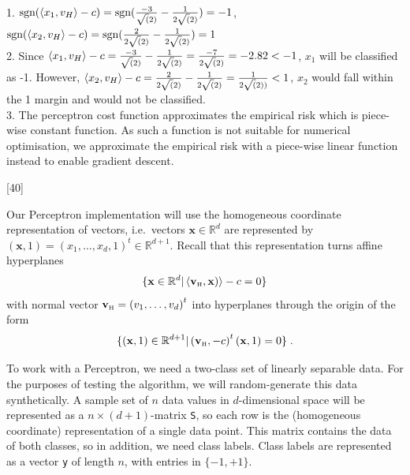 \documentclass[]{../util/ColumbiaAssm}
\begin{document}
\begin{questions}
\begin{solution}\\
1. $\textrm{sgn}(\sp{x_1, v_H} - c) = \textrm{sgn}(\frac{-3}{\sqrt(2)} - \frac{1}{2\sqrt(2)}) = -1$, $\textrm{sgn}(\sp{x_2, v_H} - c) = \textrm{sgn}(\frac{2}{2\sqrt(2)} - \frac{1}{2\sqrt(2)}) = 1$\\
2. Since $\sp{x_1, v_H} - c = \frac{-3}{\sqrt(2)} - \frac{1}{2\sqrt(2)} = \frac{-7}{2\sqrt(2)} = -2.82 < -1$, $x_1$ will be classified as -1. However, $\sp{x_2, v_H} - c = \frac{2}{2\sqrt(2)} - \frac{1}{2\sqrt(2)} = \frac{1}{2\sqrt(2))} < 1$, $x_2$ would fall within the 1 margin and would not be classified.\\
3. The perceptron cost function approximates the empirical risk which is piece-wise constant function. As such a function is not suitable for numerical optimisation, we approximate the empirical risk with a piece-wise linear function instead to enable gradient descent.
\end{solution}

[40]

Our Perceptron implementation will use the homogeneous coordinate
representation of vectors, i.e.~vectors $\mathbf{x}\in\mathbb{R}^d$ are
represented by $(\mathbf{x},1)=\left( x_1,\dots,x_d,1\right)^t\in\mathbb{R}^{d+1}$.
Recall that this representation turns affine hyperplanes 
\def\vH{\mathbf{v}_{\mbox{\tiny H}}}
\def\zH{\mathbf{z}_{\mbox{\tiny H}}}
\def\sp#1{\left<#1\right>}
\begin{equation*}
        \lbrace
\mathbf{x}\in\mathbb{R}^{d} | \sp{\vH,\mathbf{x})} -c = 0
\rbrace
\end{equation*}
with normal vector $\vH=\left(v_1,\dots,v_d\right)^t$
into hyperplanes through the origin of the form
\begin{equation*}
\lbrace
(\mathbf{x},1)\in\mathbb{R}^{d+1} |
\left(\vH,-c\right)^t (\mathbf{x},1)=0
\rbrace\;.
\end{equation*}

To work with a Perceptron, we need a two-class set of linearly
separable data. For the purposes of testing the algorithm, we will random-generate
this data synthetically. A sample set of $n$ data values
in $d$-dimensional space will be represented
as a $n\times\left( d + 1\right)$-matrix {\tt S}, so each
row is the (homogeneous coordinate) representation of a single
data point. This matrix contains the data of both classes, so in
addition, we need class labels. Class labels are represented
as a vector {\tt y} of length $n$, with entries in $\lbrace -1,+1 \rbrace$.


\end{questions}
\end{document}
